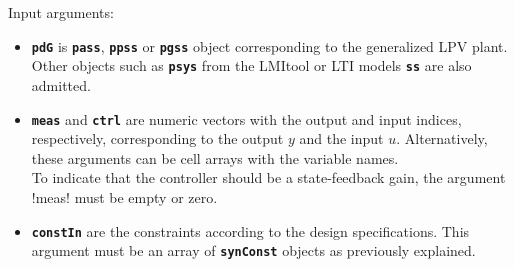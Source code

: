 \documentclass[fleqn,11pt]{article}
\newcommand{\lcode}[1]{\textbf{%
    \lstinline[style=mystyle]{#1}}}
\begin{document}
\noindent Input arguments:
\begin{itemize}
  \item \lcode{pdG} is \lcode{pass}, \lcode{ppss} or \lcode{pgss} object corresponding to the generalized LPV plant. Other objects such as \lcode{psys} from the LMItool or LTI models \lcode{ss} are also admitted.
  \item \lcode{meas} and \lcode{ctrl} are numeric vectors with the output and input indices, respectively, corresponding to the output $y$ and the input $u$. Alternatively, these arguments can be cell arrays with the variable names.\\
      To indicate that the controller should be a state-feedback gain, the argument !meas! must be empty or zero.

  \item \lcode{constIn} are the constraints according to the design specifications. This argument must be an array of \lcode{synConst} objects as previously explained.


\end{itemize}
\end{document}
